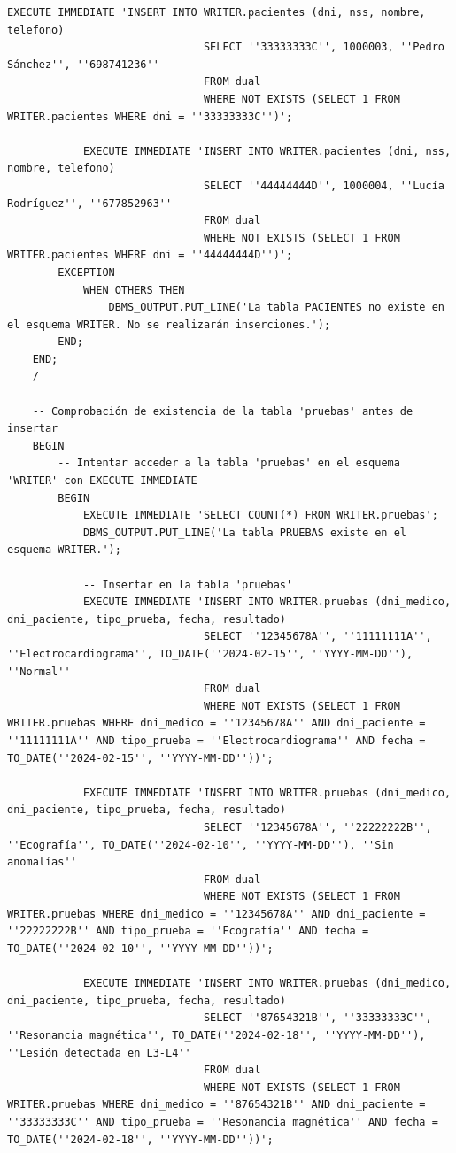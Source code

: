 \documentclass{article}
\begin{document}
\begin{lstlisting}[style=bashStyle]
            EXECUTE IMMEDIATE 'INSERT INTO WRITER.pacientes (dni, nss, nombre, telefono)
                               SELECT ''33333333C'', 1000003, ''Pedro Sánchez'', ''698741236''
                               FROM dual
                               WHERE NOT EXISTS (SELECT 1 FROM WRITER.pacientes WHERE dni = ''33333333C'')';
    
            EXECUTE IMMEDIATE 'INSERT INTO WRITER.pacientes (dni, nss, nombre, telefono)
                               SELECT ''44444444D'', 1000004, ''Lucía Rodríguez'', ''677852963''
                               FROM dual
                               WHERE NOT EXISTS (SELECT 1 FROM WRITER.pacientes WHERE dni = ''44444444D'')';
        EXCEPTION
            WHEN OTHERS THEN
                DBMS_OUTPUT.PUT_LINE('La tabla PACIENTES no existe en el esquema WRITER. No se realizarán inserciones.');
        END;
    END;
    /
    
    -- Comprobación de existencia de la tabla 'pruebas' antes de insertar
    BEGIN
        -- Intentar acceder a la tabla 'pruebas' en el esquema 'WRITER' con EXECUTE IMMEDIATE
        BEGIN
            EXECUTE IMMEDIATE 'SELECT COUNT(*) FROM WRITER.pruebas';
            DBMS_OUTPUT.PUT_LINE('La tabla PRUEBAS existe en el esquema WRITER.');
    
            -- Insertar en la tabla 'pruebas'
            EXECUTE IMMEDIATE 'INSERT INTO WRITER.pruebas (dni_medico, dni_paciente, tipo_prueba, fecha, resultado)
                               SELECT ''12345678A'', ''11111111A'', ''Electrocardiograma'', TO_DATE(''2024-02-15'', ''YYYY-MM-DD''), ''Normal''
                               FROM dual
                               WHERE NOT EXISTS (SELECT 1 FROM WRITER.pruebas WHERE dni_medico = ''12345678A'' AND dni_paciente = ''11111111A'' AND tipo_prueba = ''Electrocardiograma'' AND fecha = TO_DATE(''2024-02-15'', ''YYYY-MM-DD''))';
    
            EXECUTE IMMEDIATE 'INSERT INTO WRITER.pruebas (dni_medico, dni_paciente, tipo_prueba, fecha, resultado)
                               SELECT ''12345678A'', ''22222222B'', ''Ecografía'', TO_DATE(''2024-02-10'', ''YYYY-MM-DD''), ''Sin anomalías''
                               FROM dual
                               WHERE NOT EXISTS (SELECT 1 FROM WRITER.pruebas WHERE dni_medico = ''12345678A'' AND dni_paciente = ''22222222B'' AND tipo_prueba = ''Ecografía'' AND fecha = TO_DATE(''2024-02-10'', ''YYYY-MM-DD''))';
    
            EXECUTE IMMEDIATE 'INSERT INTO WRITER.pruebas (dni_medico, dni_paciente, tipo_prueba, fecha, resultado)
                               SELECT ''87654321B'', ''33333333C'', ''Resonancia magnética'', TO_DATE(''2024-02-18'', ''YYYY-MM-DD''), ''Lesión detectada en L3-L4''
                               FROM dual
                               WHERE NOT EXISTS (SELECT 1 FROM WRITER.pruebas WHERE dni_medico = ''87654321B'' AND dni_paciente = ''33333333C'' AND tipo_prueba = ''Resonancia magnética'' AND fecha = TO_DATE(''2024-02-18'', ''YYYY-MM-DD''))';
    

\end{lstlisting}
\end{document}

